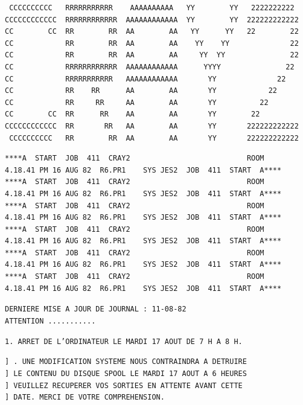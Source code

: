 {\scriptsize
\begin{verbatim}
 CCCCCCCCCC   RRRRRRRRRRR    AAAAAAAAAA   YY        YY   2222222222
CCCCCCCCCCCC  RRRRRRRRRRRR  AAAAAAAAAAAA  YY        YY  222222222222
CC        CC  RR        RR  AA        AA   YY      YY   22        22
CC            RR        RR  AA        AA    YY    YY              22
CC            RR        RR  AA        AA     YY  YY               22
CC            RRRRRRRRRRRR  AAAAAAAAAAAA      YYYY               22
CC            RRRRRRRRRRR   AAAAAAAAAAAA       YY              22
CC            RR    RR      AA        AA       YY            22
CC            RR     RR     AA        AA       YY          22
CC        CC  RR      RR    AA        AA       YY        22
CCCCCCCCCCCC  RR       RR   AA        AA       YY       222222222222
 CCCCCCCCCC   RR        RR  AA        AA       YY       222222222222
\end{verbatim}
}

{\fontsize{4.5}{5.9}\selectfont
\begin{verbatim}
****A  START  JOB  411  CRAY2                           ROOM        4.18.41 PM 16 AUG 82  R6.PR1    SYS JES2  JOB  411  START  A****
****A  START  JOB  411  CRAY2                           ROOM        4.18.41 PM 16 AUG 82  R6.PR1    SYS JES2  JOB  411  START  A****
****A  START  JOB  411  CRAY2                           ROOM        4.18.41 PM 16 AUG 82  R6.PR1    SYS JES2  JOB  411  START  A****
****A  START  JOB  411  CRAY2                           ROOM        4.18.41 PM 16 AUG 82  R6.PR1    SYS JES2  JOB  411  START  A****
****A  START  JOB  411  CRAY2                           ROOM        4.18.41 PM 16 AUG 82  R6.PR1    SYS JES2  JOB  411  START  A****
****A  START  JOB  411  CRAY2                           ROOM        4.18.41 PM 16 AUG 82  R6.PR1    SYS JES2  JOB  411  START  A****
\end{verbatim}
}

\texttt{DERNIERE MISE A JOUR DE JOURNAL : 11-08-82}\\
\texttt{ATTENTION ...........}

\texttt{1. ARRET DE L'ORDINATEUR LE MARDI 17 AOUT DE 7 H A 8 H.}

\texttt{] . UNE MODIFICATION SYSTEME NOUS CONTRAINDRA A DETRUIRE}\\
\texttt{] \qquad LE CONTENU DU DISQUE SPOOL LE MARDI 17 AOUT A 6 HEURES}\\
\texttt{] \qquad VEUILLEZ RECUPERER VOS SORTIES EN ATTENTE AVANT CETTE}\\
\texttt{] \qquad DATE. MERCI DE VOTRE COMPREHENSION.}


